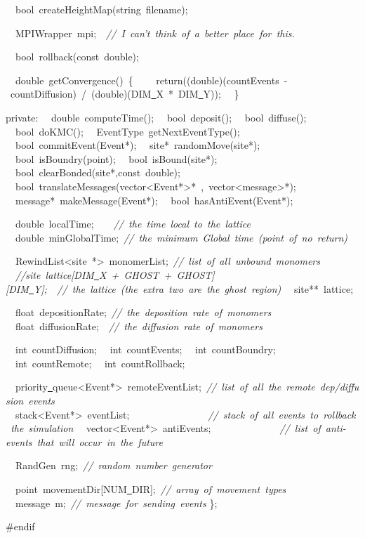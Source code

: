 {\ \ bool\ createHeightMap(string\ filename);

\ \ MPIWrapper\ mpi;\ \ \textsl{//\ I\ can't\ think\ of\ a\ better\ place\ for\ this.}

\ \ bool\ rollback(const\ double);

\ \ double\ getConvergence()\ \{
\ \ \ \ return((double)(countEvents\ -{}\ countDiffusion)\ /\ (double)(DIM\underline\ X\ *\ DIM\underline\ Y));
\ \ \}

private:
\ \ double\ computeTime();
\ \ bool\ deposit();
\ \ bool\ diffuse();
\ \ bool\ doKMC();
\ \ EventType\ getNextEventType();
\ \ bool\ commitEvent(Event*);
\ \ site*\ randomMove(site*);
\ \ bool\ isBoundry(point);
\ \ bool\ isBound(site*);
\ \ bool\ clearBonded(site*,const\ double);
\ \ bool\ translateMessages(vector<{}Event*>{}*\ ,\ vector<{}message>{}*);
\ \ message*\ makeMessage(Event*);
\ \ bool\ hasAntiEvent(Event*);

\ \ double\ localTime;\ \ \ \ \textsl{//\ the\ time\ local\ to\ the\ lattice}
\ \ double\ minGlobalTime;\ \textsl{//\ the\ minimum\ Global\ time\ (point\ of\ no\ return)}

\ \ RewindList<{}site\ *>{}\ monomerList;\ \textsl{//\ list\ of\ all\ unbound\ monomers}
\ \ \textsl{//site\ lattice[DIM\underline\ X\ +\ GHOST\ +\ GHOST][DIM\underline\ Y];\ \ //\ the\ lattice\ (the\ extra\ two\ are\ the\ ghost\ region)}
\ \ site**\ lattice;

\ \ float\ depositionRate;\ \textsl{//\ the\ deposition\ rate\ of\ monomers}
\ \ float\ diffusionRate;\ \ \textsl{//\ the\ diffusion\ rate\ of\ monomers}

\ \ int\ countDiffusion;
\ \ int\ countEvents;
\ \ int\ countBoundry;
\ \ int\ countRemote;
\ \ int\ countRollback;

\ \ priority\underline\ queue<{}Event*>{}\ remoteEventList;\ \textsl{//\ list\ of\ all\ the\ remote\ dep/diffusion\ events}
\ \ stack<{}Event*>{}\ eventList;\ \ \ \ \ \ \ \ \ \ \ \ \ \ \ \ \textsl{//\ stack\ of\ all\ events\ to\ rollback\ the\ simulation}
\ \ vector<{}Event*>{}\ antiEvents;\ \ \ \ \ \ \ \ \ \ \ \ \ \ \textsl{//\ list\ of\ anti-{}events\ that\ will\ occur\ in\ the\ future}

\ \ RandGen\ rng;\ \textsl{//\ random\ number\ generator}

\ \ point\ movementDir[NUM\underline\ DIR];\ \textsl{//\ array\ of\ movement\ types}
\ \ message\ m;\ \textsl{//\ message\ for\ sending\ events}
\};

\#endif

 }
\normalfont\normalsize

